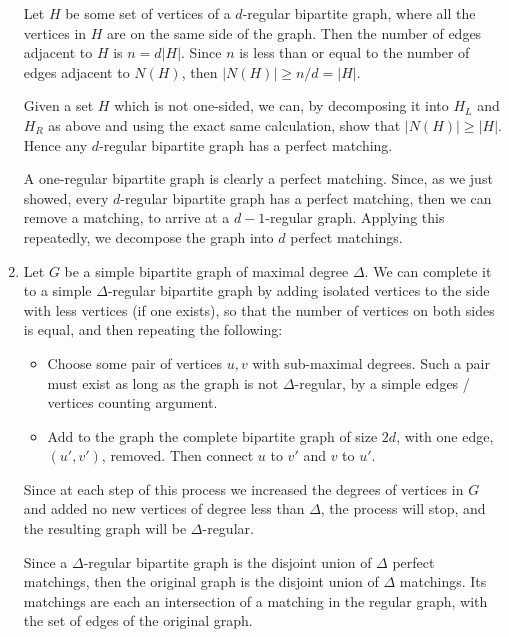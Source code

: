 \documentclass[11pt]{article} \usepackage{amssymb}
\begin{document}
\begin{enumerate}
  Let $H$ be some set of vertices of a $d$-regular
  bipartite graph, where all the vertices in $H$ are on the same side of the 
  graph. Then the number of edges adjacent to $H$ is $n=d|H|$. Since $n$
  is less than or equal to the number of edges adjacent to $N(H)$, then
  $|N(H)|\geq n/d=|H|$. 

  Given a set $H$ which is not one-sided, we can, by decomposing it into 
  $H_L$ and $H_R$ as above and using the exact same calculation, show that 
  $|N(H)|\geq|H|$. Hence any $d$-regular bipartite graph has a perfect matching.
  
  
  A one-regular bipartite graph is clearly a perfect matching. 
  Since, as we just showed, every $d$-regular bipartite graph has a perfect
  matching, then we can remove a matching, 
  to arrive at a $d-1$-regular graph. Applying
  this repeatedly, we decompose the graph into $d$ perfect matchings.

\item
  Let $G$ be a simple bipartite graph of maximal degree $\Delta$. We can 
  complete it to a simple $\Delta$-regular bipartite graph by adding isolated
  vertices  to the side with less vertices (if one exists), so that
  the number of vertices on both sides is equal, and then repeating the 
  following:
  \begin{itemize}
  \item Choose some pair of vertices
    $u,v$ with sub-maximal degrees. Such a pair must exist as long as the graph
    is not $\Delta$-regular, by a simple edges / vertices counting argument.
  \item Add to the graph the complete bipartite
    graph of size $2d$, with one edge, $(u',v')$, removed. Then connect
    $u$ to $v'$ and $v$ to $u'$.
  \end{itemize}
  Since at each step of this process we increased the degrees of vertices
  in $G$ and added no new vertices of degree less than $\Delta$, the process 
  will
  stop, and the resulting graph will be $\Delta$-regular. 

  Since a $\Delta$-regular bipartite graph is the disjoint union
  of $\Delta$ perfect matchings, then the original graph is the disjoint
  union of $\Delta$ matchings. Its matchings are each an intersection of a 
  matching in the regular graph, with the set of edges of the original graph.
\end{enumerate}
\end{document}
